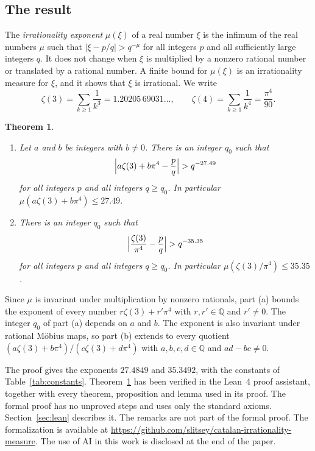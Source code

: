 \documentclass[11pt]{amsart}
\newcommand{\FormalizationURL}{https://github.com/slitsey/catalan-irrationality-measure}
\newcommand{\FormalizationLink}{\url{\FormalizationURL}}
\newtheorem{theorem}{Theorem}[section]
\theoremstyle{definition}
\theoremstyle{remark}
\numberwithin{equation}{section}
\newcommand{\Q}{\mathbb Q}
\begin{document}
\subsection{The result}
The \emph{irrationality exponent} $\mu(\xi)$ of a real number $\xi$ is the infimum of the real numbers $\mu$ such
that $|\xi-p/q|>q^{-\mu}$ for all integers $p$ and all sufficiently large integers $q$. It does not change when
$\xi$ is multiplied by a nonzero rational number or translated by a rational number. A finite bound for $\mu(\xi)$
is an irrationality measure for $\xi$, and it shows that $\xi$ is irrational. We write
\[
 \zeta(3)=\sum_{k\ge1}\frac1{k^3}=1.20205\,69031\ldots,\qquad \zeta(4)=\sum_{k\ge1}\frac1{k^4}=\frac{\pi^4}{90}.
\]

\begin{theorem}\label{thm:main}
\begin{enumerate}[label=(\alph*)]
\item Let $a$ and $b$ be integers with $b\ne0$. There is an integer $q_0$ such that
\[
 \Bigl|a\zeta(3)+b\pi^4-\frac pq\Bigr|>q^{-27.49}
\]
for all integers $p$ and all integers $q\ge q_0$. In particular $\mu(a\zeta(3)+b\pi^4)\le27.49$.
\item There is an integer $q_0$ such that
\[
 \Bigl|\frac{\zeta(3)}{\pi^4}-\frac pq\Bigr|>q^{-35.35}
\]
for all integers $p$ and all integers $q\ge q_0$. In particular $\mu(\zeta(3)/\pi^4)\le35.35$.
\end{enumerate}
\end{theorem}

Since $\mu$ is invariant under multiplication by nonzero rationals, part (a) bounds the exponent of every number
$r\zeta(3)+r'\pi^4$ with $r,r'\in\Q$ and $r'\ne0$. The integer $q_0$ of part (a) depends on $a$ and $b$.
The exponent is also invariant under rational M\"obius maps, so part (b) extends to every quotient
$(a\zeta(3)+b\pi^4)/(c\zeta(3)+d\pi^4)$ with $a,b,c,d\in\Q$ and $ad-bc\ne0$.

The proof gives the exponents $27.4849$ and $35.3492$, with the
constants of Table~\ref{tab:constants}.
Theorem~\ref{thm:main} has been verified in the Lean~4 proof assistant, together
with every theorem, proposition and lemma used in its proof. The formal proof has no unproved steps and uses only the standard axioms.
Section~\ref{sec:lean} describes it. The remarks are not part of the formal proof. The formalization is available at
\FormalizationLink. The use of AI in this work is disclosed at the end of the paper.
\end{document}
